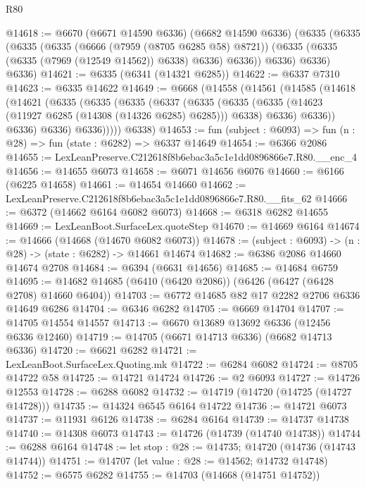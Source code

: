 \begin{lexlean}{R80}
\begin{coremodule}
@14618 := @6670
    (@6671 @14590 @6336)
    (@6682 @14590 @6336)
    (@6335
      (@6335
        (@6335
          (@6335
            (@6666 (@7959 (@8705 @6285 @58) @8721))
            (@6335 (@6335 (@6335 (@7969 (@12549 @14562)) @6338) @6336) @6336))
          @6336)
        @6336)
      @6336)
@14621 := @6335 (@6341 (@14321 @6285))
@14622 := @6337 @7310
@14623 := @6335 @14622
@14649 := @6668
    (@14558
      (@14561
        (@14585
          (@14618
            (@14621
              (@6335
                (@6335
                  (@6335
                    (@6337
                      (@6335
                        (@6335
                          (@6335 (@14623 (@11927 @6285 (@14308 (@14326 @6285) @6285))) @6338)
                          @6336)
                        @6336))
                    @6336)
                  @6336)
                @6336)))))
      @6338)
@14653 := fun (subject : @6093) => fun (n : @28) => fun (state : @6282) => @6337 @14649
@14654 := @6366 @2086
@14655 := LexLeanPreserve.C212618f8b6ebac3a5c1e1dd0896866e7.R80.__enc_4
@14656 := @14655 @6073
@14658 := @6071 @14656 @6076
@14660 := @6166 (@6225 @14658)
@14661 := @14654 @14660
@14662 := LexLeanPreserve.C212618f8b6ebac3a5c1e1dd0896866e7.R80.__fits_62
@14666 := @6372 (@14662 @6164 @6082 @6073)
@14668 := @6318 @6282 @14655
@14669 := LexLeanBoot.SurfaceLex.quoteStep
@14670 := @14669 @6164
@14674 := @14666 (@14668 (@14670 @6082 @6073))
@14678 := (subject : @6093) -> (n : @28) -> (state : @6282) -> @14661 @14674
@14682 := @6386 @2086 @14660 @14674 @2708
@14684 := @6394 (@6631 @14656)
@14685 := @14684 @6759
@14695 := @14682 @14685 (@6410 (@6420 @2086)) (@6426 (@6427 (@6428 @2708) @14660 @6404))
@14703 := @6772 @14685 @82 @17 @2282 @2706 @6336 @14649 @6286
@14704 := @6346 @6282
@14705 := @6669 @14704
@14707 := @14705 @14554 @14557
@14713 := @6670 @13689 @13692 @6336 (@12456 @6336 @12460)
@14719 := @14705 (@6671 @14713 @6336) (@6682 @14713 @6336)
@14720 := @6621 @6282
@14721 := LexLeanBoot.SurfaceLex.Quoting.mk
@14722 := @6284 @6082
@14724 := @8705 @14722 @58
@14725 := @14721 @14724
@14726 := @2 @6093
@14727 := @14726 @12553
@14728 := @6288 @6082
@14732 := @14719 (@14720 (@14725 (@14727 @14728)))
@14735 := @14324 @6545 @6164 @14722
@14736 := @14721 @6073
@14737 := @11931 @6126
@14738 := @6284 @6164
@14739 := @14737 @14738
@14740 := @14308 @6073
@14743 := @14726 (@14739 (@14740 @14738))
@14744 := @6288 @6164
@14748 := let stop : @28 := @14735; @14720 (@14736 (@14743 @14744))
@14751 := @14707 (let value : @28 := @14562; @14732 @14748)
@14752 := @6575 @6282
@14755 := @14703 (@14668 (@14751 @14752))

\end{coremodule}
\end{lexlean}
